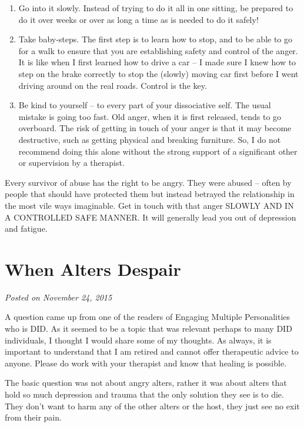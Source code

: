 \documentclass[]{book}
\begin{document}
\begin{enumerate}
\def\labelenumi{\arabic{enumi}.}
\item
  Go into it slowly. Instead of trying to do it all in one sitting, be prepared to do it over weeks or over as long a time as is needed to do it safely!
\item
  Take baby-steps. The first step is to learn how to stop, and to be able to go for a walk to ensure that you are establishing safety and control of the anger. It is like when I first learned how to drive a car -- I made sure I knew how to step on the brake correctly to stop the (slowly) moving car first before I went driving around on the real roads. Control is the key.
\item
  Be kind to yourself -- to every part of your dissociative self. The usual mistake is going too fast. Old anger, when it is first released, tends to go overboard. The risk of getting in touch of your anger is that it may become destructive, such as getting physical and breaking furniture. So, I do not recommend doing this alone without the strong support of a significant other or supervision by a therapist.
\end{enumerate}

Every survivor of abuse has the right to be angry. They were abused -- often by people that should have protected them but instead betrayed the relationship in the most vile ways imaginable. Get in touch with that anger SLOWLY AND IN A CONTROLLED SAFE MANNER. It will generally lead you out of depression and fatigue.

\hypertarget{when-alters-despair}{%
\section{When Alters Despair}\label{when-alters-despair}}

\emph{Posted on November 24, 2015}

A question came up from one of the readers of Engaging Multiple Personalities who is DID. As it seemed to be a topic that was relevant perhaps to many DID individuals, I thought I would share some of my thoughts. As always, it is important to understand that I am retired and cannot offer therapeutic advice to anyone. Please do work with your therapist and know that healing is possible.

The basic question was not about angry alters, rather it was about alters that hold so much depression and trauma that the only solution they see is to die. They don't want to harm any of the other alters or the host, they just see no exit from their pain.
\end{document}
